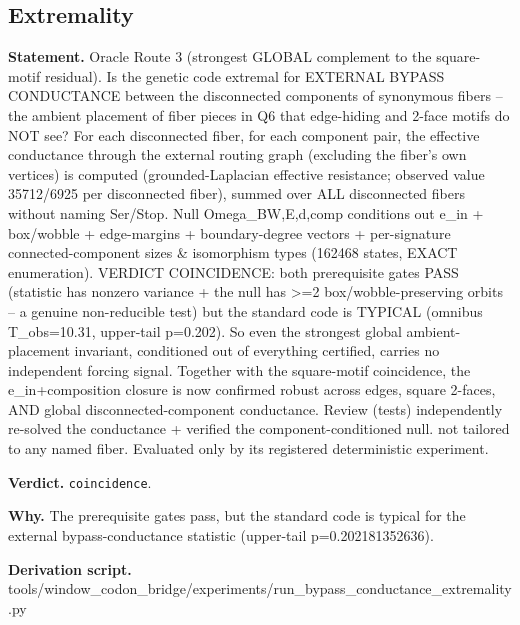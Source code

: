 \subsection{Extremality}\label{sec:bridge-extremality}
\textbf{Statement.} Oracle Route 3 (strongest GLOBAL complement to the square-motif residual). Is the genetic code
extremal for EXTERNAL BYPASS CONDUCTANCE between the disconnected components of synonymous fibers --
the ambient placement of fiber pieces in Q6 that edge-hiding and 2-face motifs do NOT see? For each
disconnected fiber, for each component pair, the effective conductance through the external routing
graph (excluding the fiber's own vertices) is computed (grounded-Laplacian effective resistance;
observed value 35712/6925 per disconnected fiber), summed over ALL disconnected fibers without
naming Ser/Stop. Null Omega\_BW,E,d,comp conditions out e\_in + box/wobble + edge-margins +
boundary-degree vectors + per-signature connected-component sizes \& isomorphism types (162468
states, EXACT enumeration). VERDICT COINCIDENCE: both prerequisite gates PASS (statistic has nonzero
variance + the null has >=2 box/wobble-preserving orbits -- a genuine non-reducible test) but the
standard code is TYPICAL (omnibus T\_obs=10.31, upper-tail p=0.202). So even the strongest global
ambient-placement invariant, conditioned out of everything certified, carries no independent forcing
signal. Together with the square-motif coincidence, the e\_in+composition closure is now confirmed
robust across edges, square 2-faces, AND global disconnected-component conductance. Review (tests)
independently re-solved the conductance + verified the component-conditioned null. not tailored to
any named fiber. Evaluated only by its registered deterministic experiment.

\textbf{Verdict.} \texttt{coincidence}.

\textbf{Why.} The prerequisite gates pass, but the standard code is typical for the external bypass-conductance
statistic (upper-tail p=0.202181352636).

\textbf{Derivation script.} tools/window\_codon\_bridge/experiments/run\_bypass\_conductance\_extremality.py

